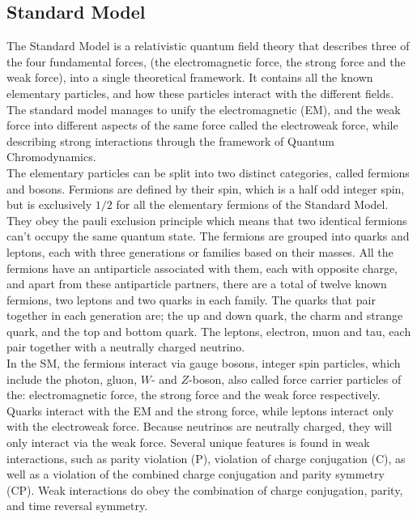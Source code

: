 \documentclass[12pt,a4paper]{article}
\numberwithin{equation}{section}
\begin{document}
\subsection{Standard Model}
The Standard Model is a relativistic quantum field theory that describes three
of the four fundamental forces, (the electromagnetic force, the strong force and
the weak force), into a single theoretical framework. It contains all the known
elementary particles, and how these particles interact with the different
fields. The standard model manages to unify the electromagnetic (EM), and the
weak force into different aspects of the same force called the electroweak
force, while describing strong interactions through the framework of Quantum
Chromodynamics.\\

The elementary particles can be split into two distinct categories, called
fermions and bosons. Fermions are defined by their spin, which is a half odd
integer spin, but is exclusively $1/2$ for all the elementary fermions of the
Standard Model. They obey the pauli exclusion principle which means that two
identical fermions can't occupy the same quantum state. The fermions are grouped
into quarks and leptons, each with three generations or families based on their
masses. All the fermions have an antiparticle associated with them, each with
opposite charge, and apart from these antiparticle partners, there are a total
of twelve known fermions, two leptons and two quarks in each family. The quarks
that pair together in each generation are; the up and down quark, the charm and
strange quark, and the top and bottom quark. The leptons, electron, muon and
tau, each pair together with a neutrally charged neutrino.\\


In the SM, the fermions interact via gauge bosons, integer spin particles, which
include the photon, gluon, $W$- and $Z$-boson, also called force carrier
particles of the: electromagnetic force, the strong force and the weak force
respectively. Quarks interact with the EM and the strong force, while leptons
interact only with the electroweak force. Because neutrinos are neutrally
charged, they will only interact via the weak force. Several unique features is
found in weak interactions, such as parity violation (P), violation of charge
conjugation (C), as well as a violation of the combined charge conjugation and
parity symmetry (CP). Weak interactions do obey the combination of charge
conjugation, parity, and time reversal symmetry.
\end{document}
